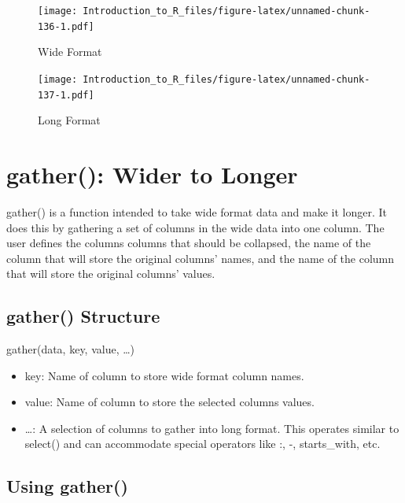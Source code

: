 \documentclass[]{book}
\providecommand{\tightlist}{%
  \setlength{\itemsep}{0pt}\setlength{\parskip}{0pt}}
\theoremstyle{definition}
\theoremstyle{definition}
\theoremstyle{definition}
\theoremstyle{remark}
\begin{document}
\begin{figure}
\centering
\texttt{[image: Introduction\_to\_R\_files/figure-latex/unnamed-chunk-136-1.pdf]}
\caption{\label{fig:unnamed-chunk-136}Wide Format}
\end{figure}

\begin{figure}
\centering
\texttt{[image: Introduction\_to\_R\_files/figure-latex/unnamed-chunk-137-1.pdf]}
\caption{\label{fig:unnamed-chunk-137}Long Format}
\end{figure}

\hypertarget{gather-wider-to-longer}{%
\section{gather(): Wider to Longer}\label{gather-wider-to-longer}}

gather() is a function intended to take wide format data and make it longer. It does this by gathering a set of columns in the wide data into one column. The user defines the columns columns that should be collapsed, the name of the column that will store the original columns' names, and the name of the column that will store the original columns' values.

\hypertarget{gather-structure}{%
\subsection{gather() Structure}\label{gather-structure}}

gather(data, key, value, \ldots{})

\begin{itemize}
\tightlist
\item
  key: Name of column to store wide format column names.
\item
  value: Name of column to store the selected columns values.
\item
  \ldots{}: A selection of columns to gather into long format. This operates similar to select() and can accommodate special operators like :, -, starts\_with, etc.
\end{itemize}

\hypertarget{using-gather}{%
\subsection{Using gather()}\label{using-gather}}
\end{document}
